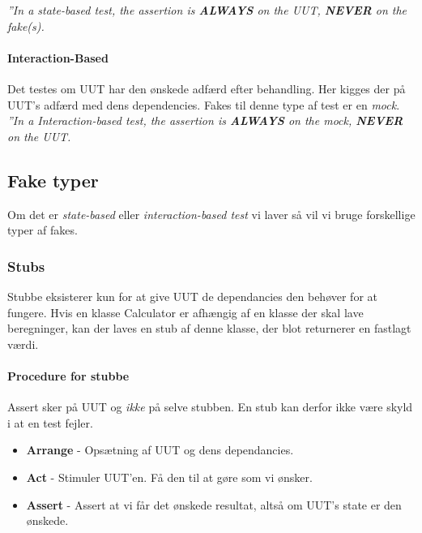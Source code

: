 \textit{''In a state-based test, the assertion is \textbf{ALWAYS} on the UUT, \textbf{NEVER} on the fake(s).}

\paragraph{Interaction-Based} Det testes om UUT har den ønskede adfærd efter behandling. Her kigges der på UUT's adfærd med dens dependencies. Fakes til denne type af test er en \textit{mock}.\\

\textit{''In a Interaction-based test, the assertion is \textbf{ALWAYS} on the mock, \textbf{NEVER} on the UUT.}

\subsection{Fake typer}
Om det er \textit{state-based} eller \textit{interaction-based test} vi laver så vil vi bruge forskellige typer af fakes.

\subsubsection{Stubs}
Stubbe eksisterer kun for at give UUT de dependancies den behøver for at fungere.
Hvis en klasse Calculator er afhængig af en klasse der skal lave beregninger, kan der laves en stub af denne klasse, der blot returnerer en fastlagt værdi.

\paragraph{Procedure for stubbe} Assert sker på UUT og \textit{ikke} på selve stubben. En stub kan derfor ikke være skyld i at en test fejler.

\begin{itemize}
	\item \textbf{Arrange} - Opsætning af UUT og dens dependancies.
	\item \textbf{Act} - Stimuler UUT'en. Få den til at gøre som vi ønsker.
	\item \textbf{Assert} - Assert at vi får det ønskede resultat, altså om UUT's state er den ønskede.
\end{itemize}


